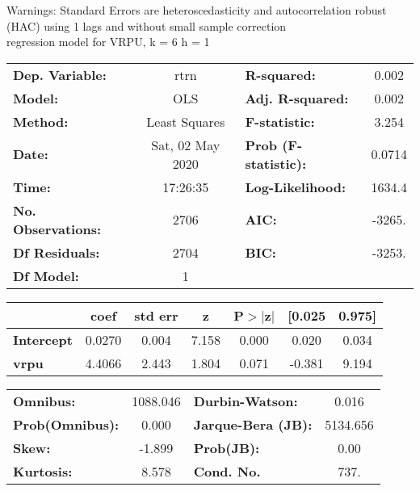Warnings: \newline
 [1] Standard Errors are heteroscedasticity and autocorrelation robust (HAC) using 1 lags and without small sample correction\\ 

regression model for VRPU, k = 6 h = 1\begin{center}
\begin{tabular}{lclc}
\toprule
\textbf{Dep. Variable:}    &       rtrn       & \textbf{  R-squared:         } &     0.002   \\
\textbf{Model:}            &       OLS        & \textbf{  Adj. R-squared:    } &     0.002   \\
\textbf{Method:}           &  Least Squares   & \textbf{  F-statistic:       } &     3.254   \\
\textbf{Date:}             & Sat, 02 May 2020 & \textbf{  Prob (F-statistic):} &   0.0714    \\
\textbf{Time:}             &     17:26:35     & \textbf{  Log-Likelihood:    } &    1634.4   \\
\textbf{No. Observations:} &        2706      & \textbf{  AIC:               } &    -3265.   \\
\textbf{Df Residuals:}     &        2704      & \textbf{  BIC:               } &    -3253.   \\
\textbf{Df Model:}         &           1      & \textbf{                     } &             \\
\bottomrule
\end{tabular}
\begin{tabular}{lcccccc}
                   & \textbf{coef} & \textbf{std err} & \textbf{z} & \textbf{P$> |$z$|$} & \textbf{[0.025} & \textbf{0.975]}  \\
\midrule
\textbf{Intercept} &       0.0270  &        0.004     &     7.158  &         0.000        &        0.020    &        0.034     \\
\textbf{vrpu}      &       4.4066  &        2.443     &     1.804  &         0.071        &       -0.381    &        9.194     \\
\bottomrule
\end{tabular}
\begin{tabular}{lclc}
\textbf{Omnibus:}       & 1088.046 & \textbf{  Durbin-Watson:     } &    0.016  \\
\textbf{Prob(Omnibus):} &   0.000  & \textbf{  Jarque-Bera (JB):  } & 5134.656  \\
\textbf{Skew:}          &  -1.899  & \textbf{  Prob(JB):          } &     0.00  \\
\textbf{Kurtosis:}      &   8.578  & \textbf{  Cond. No.          } &     737.  \\
\bottomrule
\end{tabular}
\end{center}

